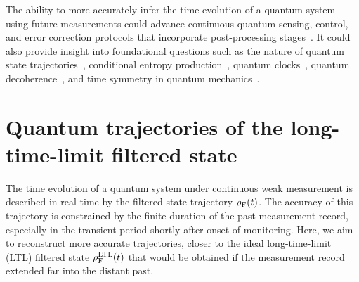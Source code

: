 \documentclass[aps,prx,twocolumn,amsmath,amssymb,superscriptaddress,floatfix,longbibliography
]{revtex4-2}
\begin{document}
The ability to more accurately infer the time evolution of a quantum system using future measurements could advance continuous quantum sensing, control, and error correction protocols that incorporate post-processing stages~\cite{convy2022machine,livingston2022experimental}. It could also provide insight into foundational questions such as the nature of quantum state trajectories~\cite{wiseman1996quantum}, conditional entropy production~\cite{rossi2020experimental}, quantum clocks~\cite{he2023effect}, quantum decoherence~\cite{wiseman2001inequivalence}, and time symmetry in quantum mechanics~\cite{aharonov1964time}.

\section{Quantum trajectories of the long-time-limit filtered state} \label{Sec:trans}

The time evolution of a quantum system under continuous weak measurement is described in real time by the filtered state trajectory $\rho_{\text F}(t)$. The accuracy of this trajectory is
constrained by
the finite duration of the past measurement record, especially in the transient period shortly after onset of monitoring. Here, we aim to reconstruct more accurate trajectories, closer to the ideal long-time-limit (LTL) filtered state $\rho_{\text F}^\text{LTL}(t)$ that
would be obtained if the measurement record extended far into the distant past.
\end{document}
